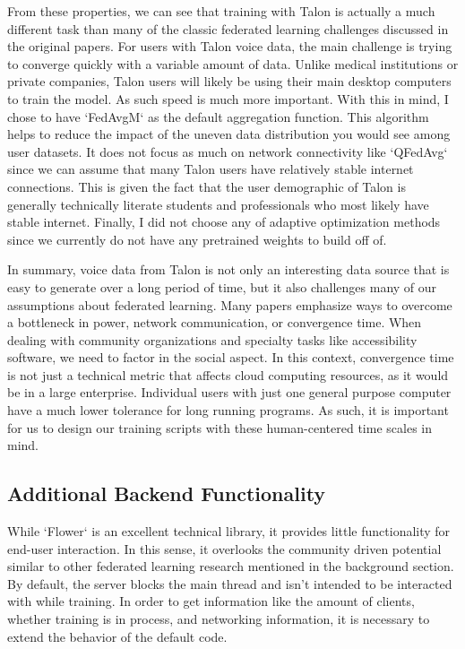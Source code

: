 \documentclass[manuscript,screen,review]{acmart}
\begin{document}
From these properties, we can see that training with Talon is actually a much different task than many of the classic federated learning challenges discussed in the original papers. \cite{https://doi.org/10.48550/arxiv.1602.05629}   For users with Talon voice data, the main challenge is trying to converge quickly with a variable amount of data. Unlike medical institutions or private companies, Talon users will likely be using their main desktop computers to train the model. As such speed is much more important. With this in mind, I chose to have `FedAvgM` as the default aggregation function. This algorithm helps to reduce the impact of the uneven data distribution you would see among user datasets. It does not focus as much on network connectivity like `QFedAvg` since we can assume that many Talon users have relatively stable internet connections. This is given the fact that the user demographic of Talon is generally technically literate students and professionals who most likely have stable internet. Finally, I did not choose any of adaptive optimization methods since we currently do not have any pretrained weights to build off of.

In summary, voice data from Talon is not only an interesting data source that is easy to generate over a long period of time, but it also challenges many of our assumptions about federated learning. Many papers emphasize ways to overcome a bottleneck in power, network communication, or convergence time. When dealing with community organizations and specialty tasks like accessibility software, we need to factor in the social aspect. In this context, convergence time is not just a technical metric that affects cloud computing resources, as it would be in a large enterprise. Individual users with just one general purpose computer have a much lower tolerance for long running programs. As such, it is important for us to design our training scripts with these human-centered time scales in mind.

\subsection{Additional Backend Functionality}


While `Flower` is an excellent technical library, it provides little functionality for end-user interaction. In this sense, it overlooks the community driven potential similar to other federated learning research mentioned in the background section. By default, the server blocks the main thread and isn't intended to be interacted with while training. In order to get information like the amount of clients, whether training is in process, and networking information, it is necessary to extend the behavior of the default code.
\end{document}
